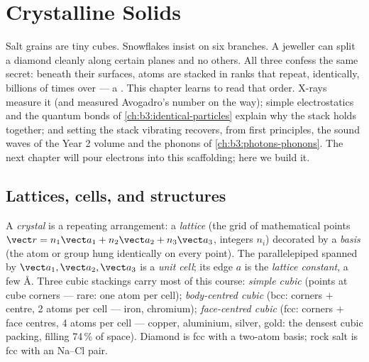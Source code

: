 \chapter{Crystalline Solids}\label{ch:b3:crystalline-solids}


Salt grains are tiny cubes. Snowflakes insist on six branches. A
jeweller can split a diamond cleanly along certain planes and no
others. All three confess the same secret: beneath their surfaces,
atoms are stacked in ranks that repeat, identically, billions of
times over --- a \emph{}. This chapter learns to read that
order. X-rays measure it (and measured Avogadro's number on the way);
simple electrostatics and the quantum bonds of
\cref{ch:b3:identical-particles} explain why the stack holds
together; and setting the stack vibrating recovers, from first
principles, the sound waves of the Year 2 volume and the phonons of
\cref{ch:b3:photons-phonons}. The next chapter will pour electrons
into this scaffolding; here we build it.

\section{Lattices, cells, and structures}

\begin{definition}\label{def:b3:crystalline-solids:lattice}
A \emph{crystal} is a repeating arrangement: a \emph{lattice} (the
grid of mathematical points $\vect r = n_1\vect a_1 + n_2\vect a_2
+ n_3\vect a_3$, integers $n_i$) decorated by a \emph{basis} (the
atom or group hung identically on every point). The parallelepiped
spanned by $\vect a_1, \vect a_2, \vect a_3$ is a \emph{unit cell};
its edge $a$ is the \emph{lattice constant}, a few
\unit{\angstrom}. Three cubic stackings carry most of this course:
\emph{simple cubic} (points at cube corners --- rare: one atom per
cell); \emph{body-centred cubic} (bcc: corners $+$ centre, 2 atoms
per cell --- iron, chromium); \emph{face-centred cubic} (fcc:
corners $+$ face centres, 4 atoms per cell --- copper, aluminium,
silver, gold: the densest cubic packing, filling 74\,\% of space).
Diamond is fcc with a two-atom basis; rock salt is fcc with an
Na--Cl pair.
\end{definition}

